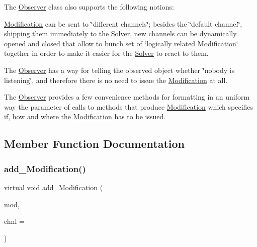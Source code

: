 The \mbox{\hyperlink{class_s_m_spp__di__unipi__it_1_1_observer}{Observer}} class also supports the following notions\+:


\begin{DoxyItemize}
\item \mbox{\hyperlink{class_s_m_spp__di__unipi__it_1_1_modification}{Modification}} can be sent to \char`\"{}different channels\char`\"{}; besides the \char`\"{}default
  channel\char`\"{}, shipping them immediately to the \mbox{\hyperlink{class_s_m_spp__di__unipi__it_1_1_solver}{Solver}}, new channels can be dynamically opened and closed that allow to bunch set of \char`\"{}logically
  related Modification\char`\"{} together in order to make it easier for the \mbox{\hyperlink{class_s_m_spp__di__unipi__it_1_1_solver}{Solver}} to react to them.
\item The \mbox{\hyperlink{class_s_m_spp__di__unipi__it_1_1_observer}{Observer}} has a way for telling the observed object whether \char`\"{}nobody
  is listening\char`\"{}, and therefore there is no need to issue the \mbox{\hyperlink{class_s_m_spp__di__unipi__it_1_1_modification}{Modification}} at all.
\item The \mbox{\hyperlink{class_s_m_spp__di__unipi__it_1_1_observer}{Observer}} provides a few convenience methods for formatting in an uniform way the parameter of calls to methods that produce \mbox{\hyperlink{class_s_m_spp__di__unipi__it_1_1_modification}{Modification}} which specifies if, how and where the \mbox{\hyperlink{class_s_m_spp__di__unipi__it_1_1_modification}{Modification}} has to be issued. 
\end{DoxyItemize}

\subsection{Member Function Documentation}
\mbox{\label{class_s_m_spp__di__unipi__it_1_1_observer_a4ac2234c8026ccbe13860a33fc4ef14e}} 
\subsubsection{\texorpdfstring{add\+\_\+\+Modification()}{add\_Modification()}}
{\footnotesize\ttfamily virtual void add\+\_\+\+Modification (\begin{DoxyParamCaption}\item[{\mbox{\hyperlink{group___modification___t_y_p_e_s_ga9024cf2ead61a1280d29771b063b1a62}{sp\+\_\+\+Mod}}}]{mod,  }\item[{\mbox{\hyperlink{class_s_m_spp__di__unipi__it_1_1_observer_a54ce8db639626e45b1f20c289baa989b}{Chnl\+Name}}}]{chnl = {} }\end{DoxyParamCaption})\hspace{0.3cm}{\ttfamily [pure virtual]}}



